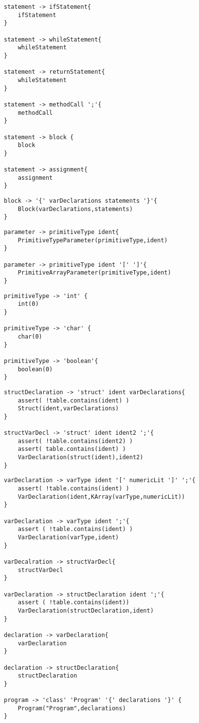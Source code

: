 \documentclass[12pt,letterpaper]{article}
\begin{document}
\begin{lstlisting}
statement -> ifStatement{
	ifStatement
}

statement -> whileStatement{
	whileStatement
}

statement -> returnStatement{
	whileStatement
}

statement -> methodCall ';'{
	methodCall 
}

statement -> block {
	block
}

statement -> assignment{
	assignment
}
\end{lstlisting}

\begin{lstlisting}
block -> '{' varDeclarations statements '}'{
	Block(varDeclarations,statements)
}	
\end{lstlisting}

\begin{lstlisting}
parameter -> primitiveType ident{
	PrimitiveTypeParameter(primitiveType,ident)
}

parameter -> primitiveType ident '[' ']'{
	PrimitiveArrayParameter(primitiveType,ident)
}
\end{lstlisting}

\begin{lstlisting}
primitiveType -> 'int' {
	int(0)
}

primitiveType -> 'char' {
	char(0)
}

primitiveType -> 'boolean'{
	boolean(0)
}
\end{lstlisting}

\begin{lstlisting}
structDeclaration -> 'struct' ident varDeclarations{
	assert( !table.contains(ident) )	
	Struct(ident,varDeclarations)
}

structVarDecl -> 'struct' ident ident2 ';'{
	assert( !table.contains(ident2) )
	assert( table.contains(ident) )
	VarDeclaration(struct(ident),ident2)
}
\end{lstlisting}

\begin{lstlisting}
varDeclaration -> varType ident '[' numericLit ']' ';'{
	assert( !table.contains(ident) ) 
	VarDeclaration(ident,KArray(varType,numericLit))
}

varDeclaration -> varType ident ';'{
	assert ( !table.contains(ident) )
	VarDeclaration(varType,ident)
}

varDecalration -> structVarDecl{
	structVarDecl
}

varDeclaration -> structDeclaration ident ';'{
	assert ( !table.contains(ident))
	VarDeclaration(structDeclaration,ident)
}

declaration -> varDeclaration{
	varDeclaration
}

declaration -> structDeclaration{
	structDeclaration
}

program -> 'class' 'Program' '{' declarations '}' {
	Program("Program",declarations)
}
\end{lstlisting}
\end{document}
